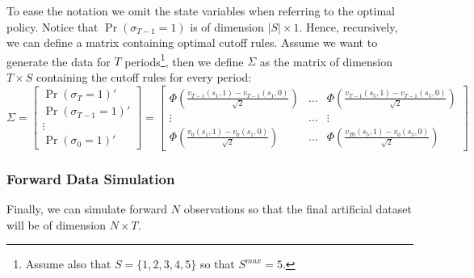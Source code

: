 \documentclass[english,letter,11pt,twoside]{article}
\begin{document}
To ease the notation we omit the state variables when referring to the optimal policy. Notice that $\Pr \left( \sigma_{T-1} = 1 \right) $ is of dimension $|S| \times 1$. Hence, recursively, we can define a matrix containing optimal cutoff rules. Assume we want to generate the data for $T$ periods\footnote{Assume also that $S=\{1,2,3,4,5\}$ so that $S^{max}=5$.}, then we define $\Sigma$ as the matrix of dimension $T \times S$ containing the cutoff rules for every period:
$$
\Sigma = 
\begin{bmatrix}
\Pr \left( \sigma_{T} = 1 \right)' \\
\Pr \left( \sigma_{T-1} = 1 \right)' \\
\vdots \\
\Pr \left( \sigma_{0} = 1 \right)'
\end{bmatrix}
= \begin{bmatrix}
\Phi \left( \frac{v_{T-1} (s_1,1) - v_{T-1} (s_1,0)}{\sqrt{2}} \right) & \hdots & \Phi \left( \frac{v_{T-1} (s_5,1) - v_{T-1} (s_5,0)}{\sqrt{2}} \right) \\
\vdots & \hdots & \vdots \\
\Phi \left( \frac{v_{0} (s_1,1) - v_{0} (s_1,0)}{\sqrt{2}} \right) & \hdots & \Phi \left( \frac{v_{T0} (s_5,1) - v_{0} (s_5,0)}{\sqrt{2}} \right)
\end{bmatrix}
$$
\begin{center}
\vspace*{2cm}
\subsubsection*{Forward Data Simulation}
\end{center}
Finally, we can simulate forward $N$ observations so that the final artificial dataset will be of dimension $N \times T$.
\end{document}
